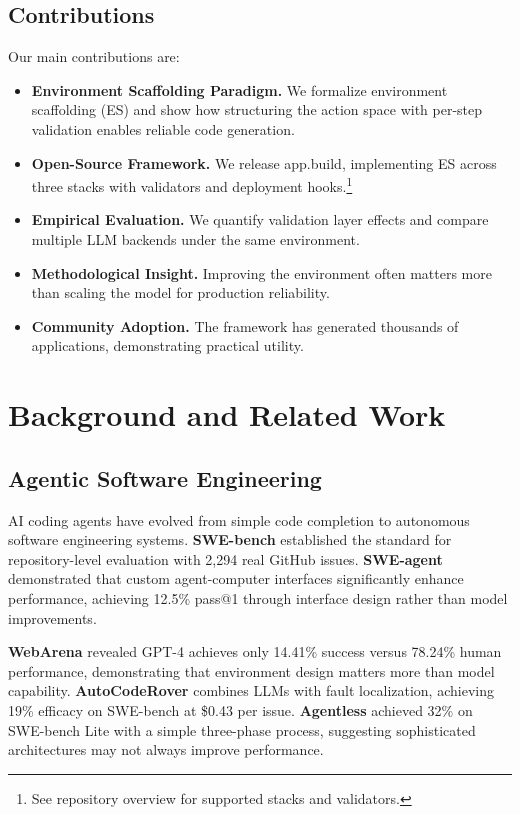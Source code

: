 \documentclass{article}
\begin{document}
\subsection{Contributions}

Our main contributions are:

\begin{itemize}
  \item \textbf{Environment Scaffolding Paradigm.} We formalize environment scaffolding (ES) and show how structuring the action space with per-step validation enables reliable code generation.
  \item \textbf{Open-Source Framework.} We release app.build, implementing ES across three stacks with validators and deployment hooks.\footnote{See repository overview for supported stacks and validators.}
  \item \textbf{Empirical Evaluation.} We quantify validation layer effects and compare multiple LLM backends under the same environment.
  \item \textbf{Methodological Insight.} Improving the environment often matters more than scaling the model for production reliability.
  \item \textbf{Community Adoption.} The framework has generated thousands of applications, demonstrating practical utility.
\end{itemize}

\section{Background and Related Work}
\label{sec:related}

\subsection{Agentic Software Engineering}

AI coding agents have evolved from simple code completion to autonomous software engineering systems. \textbf{SWE-bench} \citep{jimenez2024swe} established the standard for repository-level evaluation with 2,294 real GitHub issues. \textbf{SWE-agent} \citep{yang2024swe} demonstrated that custom agent-computer interfaces significantly enhance performance, achieving 12.5\% pass@1 through interface design rather than model improvements.

\textbf{WebArena} \citep{zhou2024webarena} revealed GPT-4 achieves only 14.41\% success versus 78.24\% human performance, demonstrating that environment design matters more than model capability. \textbf{AutoCodeRover} \citep{zhang2024autocoder} combines LLMs with fault localization, achieving 19\% efficacy on SWE-bench at \$0.43 per issue. \textbf{Agentless} \citep{xia2024agentless} achieved 32\% on SWE-bench Lite with a simple three-phase process, suggesting sophisticated architectures may not always improve performance.
\end{document}
